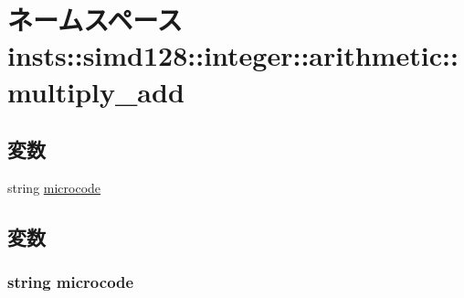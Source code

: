 \hypertarget{namespaceinsts_1_1simd128_1_1integer_1_1arithmetic_1_1multiply__add}{
\section{ネームスペース insts::simd128::integer::arithmetic::multiply\_\-add}
\label{namespaceinsts_1_1simd128_1_1integer_1_1arithmetic_1_1multiply__add}
}
\subsection*{変数}
\begin{DoxyCompactItemize}
\item 
string \hyperlink{namespaceinsts_1_1simd128_1_1integer_1_1arithmetic_1_1multiply__add_a770f11a173e99389a8802f0107ed8f52}{microcode}
\end{DoxyCompactItemize}


\subsection{変数}
\hypertarget{namespaceinsts_1_1simd128_1_1integer_1_1arithmetic_1_1multiply__add_a770f11a173e99389a8802f0107ed8f52}{
\subsubsection[{microcode}]{\setlength{\rightskip}{0pt plus 5cm}string {\bf microcode}}}
\label{namespaceinsts_1_1simd128_1_1integer_1_1arithmetic_1_1multiply__add_a770f11a173e99389a8802f0107ed8f52}
